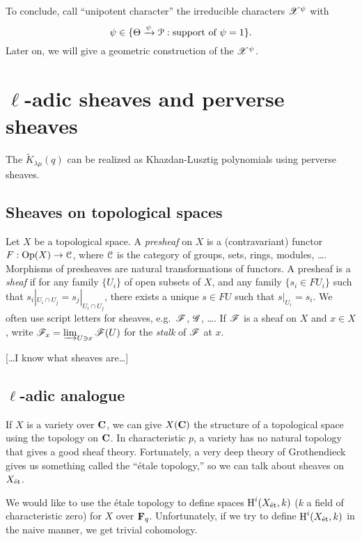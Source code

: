 \documentclass{article}
\begin{document}
To conclude, call ``unipotent character'' the irreducible characters 
$\mathscr{X}^\psi$ with 
\[
  \psi\in \{\Theta\xrightarrow\psi\mathcal{P}:\text{support of }\psi=1\} .
\]
Later on, we will give a geometric construction of the 
$\mathscr{X}^\psi$. 





\section{\texorpdfstring{$\ell$}{l}-adic sheaves and perverse sheaves}

The $\widetilde K_{\lambda\mu}(q)$ can be realized as Khazdan-Lusztig polynomials 
using perverse sheaves. 


\subsection{Sheaves on topological spaces}

Let $X$ be a topological space. A \emph{presheaf} on $X$ is a (contravariant) 
functor $F:\operatorname{Op}(X) \to \mathcal{C}$, where $\mathcal{C}$ is the category of groups, sets, 
rings, modules, \ldots. Morphisms of presheaves are natural transformations of 
functors. A presheaf is a \emph{sheaf} if for any family $\{U_i\}$ of open 
subsets of $X$, and any family $\{s_i\in F U_i\}$ such that 
$s_i|_{U_i\cap U_j} = s_j|_{U_i\cap U_j}$, there exists a unique 
$s\in F U$ such that $s|_{U_i} = s_i$. We often use script letters for sheaves, 
e.g.\ $\mathscr{F}$, $\mathscr{G}$, \ldots. If $\mathscr{F}$ is a sheaf on $X$ and $x\in X$, write 
$\mathscr{F}_x=\varinjlim_{U\ni x} \mathscr{F}(U)$ for the \emph{stalk} of $\mathscr{F}$ at $x$. 

[\ldots I know what sheaves are\ldots]


\subsection{\texorpdfstring{$\ell$}{l}-adic analogue}

If $X$ is a variety over $\mathbf{C}$, we can give $X(\mathbf{C})$ the structure of a topological 
space using the topology on $\mathbf{C}$. In characteristic $p$, a variety has no natural 
topology that gives a good sheaf theory. Fortunately, a very deep theory of 
Grothendieck gives us something called the ``\'etale topology,'' so we can talk 
about sheaves on $X_{\textnormal{\'et}}$. 

We would like to use the \'etale topology to define spaces $\operatorname{H}^i(X_{\textnormal{\'et}},k)$ ($k$ a 
field of characteristic zero) for $X$ over $\mathbf{F}_q$. Unfortunately, if we try to 
define $\operatorname{H}^i(X_{\textnormal{\'et}}, k)$ in the naive manner, we get trivial cohomology. 
\end{document}
